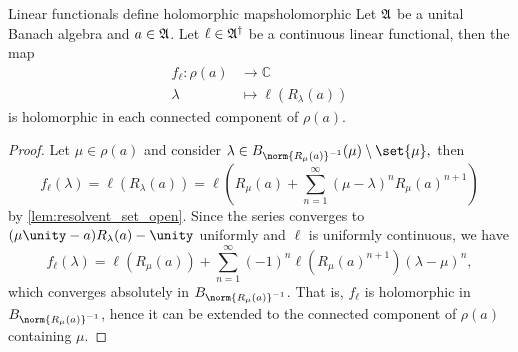 \begin{lemma}{Linear functionals define holomorphic maps}{holomorphic}
    Let \(\mathfrak{A}\) be a unital Banach algebra and \(a \in \mathfrak{A}\). Let \(\ell \in \mathfrak{A}^\dag\) be a continuous linear functional, then the map
    \begin{align*}
        f_{\ell} : \rho(a) &\to \mathbb{C}\\
                   \lambda &\mapsto \ell(R_\lambda(a))
    \end{align*}
    is holomorphic in each connected component of \(\rho(a)\).
\end{lemma}
\begin{proof}
    Let \(\mu \in \rho(a)\) and consider \(\lambda \in B_{\norm{R_\mu(a)}^{-1}}(\mu)\setminus \set{\mu},\) then
    \begin{equation}
        f_\ell(\lambda) = \ell(R_{\lambda}(a)) = \ell\left(R_{\mu}(a) + \sum_{n = 1}^{\infty} (\mu - \lambda)^n R_{\mu}(a)^{n+1}\right)
    \end{equation}
    by \cref{lem:resolvent_set_open}. Since the series converges to \((\mu \unity - a)R_{\lambda}(a) - \unity\) uniformly and \(\ell\) is uniformly continuous, we have
    \begin{equation*}
        f_\ell(\lambda) = \ell(R_{\mu}(a)) + \sum_{n = 1}^\infty (-1)^n\ell\left(R_\mu(a)^{n+1}\right)(\lambda - \mu)^n,
    \end{equation*}
    which converges absolutely in \(B_{\norm{R_\mu(a)}^{-1}}\). That is, \(f_\ell\) is holomorphic in \(B_{\norm{R_\mu(a)}^{-1}}\), hence it can be extended to the connected component of \(\rho(a)\) containing \(\mu\).
\end{proof}

